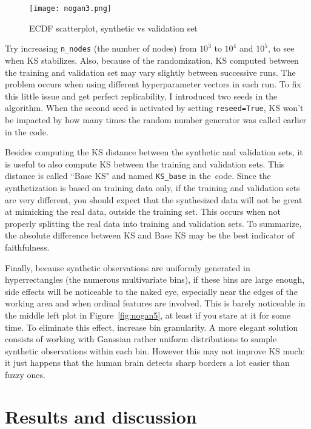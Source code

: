 \documentclass[oneside,10pt]{book}
\begin{document}
\begin{figure}[H]
\centering
\texttt{[image: nogan3.png]} %
\caption{ECDF scatterplot, synthetic vs validation set}
\label{fig:nogan3}
\end{figure}

Try increasing \texttt{n\_nodes} (the number of nodes) from $10^3$ to $10^4$ and $10^5$, to see when KS stabilizes.  Also, because of the randomization, KS computed between the training and validation set may vary slightly between successive runs.
The problem occurs when using different hyperparameter vectors in each run. To fix this little issue and get perfect replicability, I introduced two seeds in the algorithm. When the second seed is activated by setting \texttt{reseed=True}, KS won't be impacted by how many times the random number generator was called earlier in the code.

Besides computing the KS distance between the synthetic and validation sets, it is useful to also compute KS between the training and validation sets. This distance is called ``Base KS" and named \texttt{KS\_base} in the~code. Since the synthetization is based on training data only, if the training and validation sets are very different, you should expect that the synthesized data will not be great at mimicking the real data, outside the training set. 
 This occurs when not properly splitting the real data into training and validation sets. To summarize, the absolute difference between
 KS and Base KS may be the best indicator of faithfulness.

Finally, because synthetic observations are uniformly generated in hyperrectangles (the numerous multivariate bins), if these bins are large enough, side effects will be noticeable to the naked eye, especially near the edges of the working area and when ordinal features are involved.
This is barely noticeable in the middle left plot 
in Figure~\ref{fig:nogan5}, at least if you stare at it for some time. To eliminate this effect, increase bin granularity. A more elegant solution consists
 of working with Gaussian rather uniform distributions to sample synthetic observations within each bin. However this may not improve KS much: 
 it just happens that the human brain detects sharp borders a lot easier than fuzzy ones. 




\section{Results and discussion}\label{hg4cvs}
\end{document}
